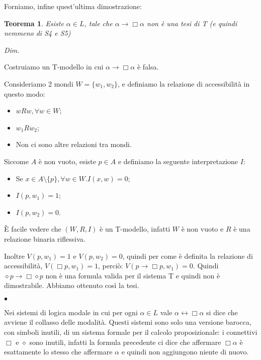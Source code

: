 \documentclass[a4paper, titlepage, 12pt]{report}
\newtheorem{theorem}{Teorema}[chapter]
\newenvironment{proof}
    {\textit{Dim.}
    }
    {\begin{flushright}$\bullet$\end{flushright}
    }
\begin{document}
Forniamo, infine quest'ultima dimostrazione:

\begin{theorem}
Esiste $\alpha \in L$, tale che $\alpha \rightarrow \Box \alpha$ non è una tesi di T (e quindi nemmeno di S4 e S5)
\end{theorem}

\begin{proof}

Costruiamo un T-modello in cui $\alpha \rightarrow \Box \alpha$ è falsa.

Consideriamo 2 mondi $W = \{w_1, w_2\}$, e definiamo la relazione di accessibilità
in questo modo:
\begin{itemize}
    \item $wRw, \forall w \in W$;
    \item $w_1Rw_2$;
    \item Non ci sono altre relazioni tra mondi.
\end{itemize}

Siccome $A$ è non vuoto, esiste $p \in A$ e definiamo la seguente interpretazione $I:$
\begin{itemize}
    \item Se $x \in A \setminus \{p\}, \forall w \in W. I(x, w) = 0$;
    \item $I(p, w_1) = 1$;
    \item $I(p, w_2) = 0$.
\end{itemize}


È facile vedere che $(W, R, I)$ è un T-modello, infatti $W$ è non vuoto e
$R$ è una relazione binaria riflessiva.

Inoltre $V(p, w_1) = 1$ e $V(p, w_2) = 0$, quindi per come è definita
la relazione di accessibilità, $V(\Box p, w_1) = 1$, perciò: $V(p \rightarrow \Box p, w_1) = 0$.
Quindi $\diamond p \rightarrow \Box\diamond p$ non è una formula valida per il sistema T e quindi
non è dimostrabile.
Abbiamo ottenuto così la tesi.

\end{proof}

Nei sistemi di logica modale in cui per ogni
$\alpha \in L$ vale $\alpha \leftrightarrow \Box \alpha$ si dice che avviene il collasso
delle modalità. Questi sistemi sono solo una versione barocca, con simboli inutili,
di un sistema formale per il calcolo proposizionale:
i connettivi $\Box$ e $\diamond$ sono inutili, infatti la formula
precedente ci dice che affermare $\Box \alpha$ è esattamente lo stesso che affermare $\alpha$
e quindi non aggiungono niente di nuovo.
\end{document}
